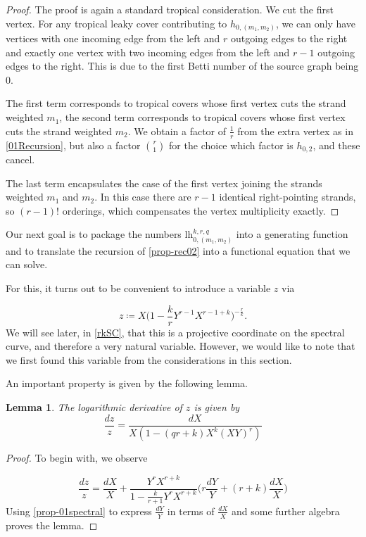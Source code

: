 \documentclass[10pt,a4paper,oneside,no-math,reqno]{amsart}%
\theoremstyle{plain}
\newtheorem{lemma}[theorem]{Lemma}
\theoremstyle{definition}
\theoremstyle{remark}
\numberwithin{equation}{section}
\newcommand{\1}{\mathds{1}}
\newcommand{\<}{\langle}
\renewcommand{\>}{\rangle}
\newcommand{\lh}{\mathord{\mathrm{l\!h}}}
\begin{document}
\begin{proof}
  The proof is again a standard tropical consideration. We cut the first vertex. For any tropical leaky cover contributing to $h_{0,(m_1,m_2)}$, we can only have vertices with one incoming edge from the left and $r$ outgoing edges to the right and exactly one vertex with two incoming edges from the left and $r-1$ outgoing edges to the right. This is due to the first Betti number of the source graph being $0$.\par
  The first term corresponds to tropical covers whose first vertex cuts the strand weighted $m_1$, the second term corresponds to tropical covers whose first vertex cuts the strand weighted $m_2$. We obtain a factor of $\frac{1}{r}$ from the extra vertex as in \cref{01Recursion}, but also a factor $ \binom{r}{1}$ for the choice which factor is $ h_{0,2}$, and these cancel.\par
  The last term encapsulates the case of the first vertex joining the strands weighted $m_1$ and $m_2$. In this case there are $r-1$ identical right-pointing strands, so $ (r-1)!$ orderings, which compensates the vertex multiplicity exactly.
\end{proof}

Our next goal is to package the numbers $\lh_{0,(m_1,m_2)}^{k,r,q}$ into a generating function and to translate the recursion of \cref{prop-rec02} into a functional equation that we can solve.

For this, it turns out to be convenient to introduce a variable $z$ via

\begin{equation}
	z \coloneq X \big( 1 - \frac{k}{r} Y^{r-1} X^{r-1+k} \big)^{-\frac{r}{k}} .
\end{equation}
We will see later, in \cref{rkSC}, that this is a projective coordinate on the spectral curve, and therefore a very natural variable. However, we would like to note that we first found this variable from the considerations in this section.


An important property is given by the following lemma.

\begin{lemma}\label{LogDerz}
	The logarithmic derivative of $z$ is given by
	\begin{equation}
		\frac{dz}{z} = \frac{dX}{X(1- (qr+k) X^k (XY)^{r})}
	\end{equation}
\end{lemma}	

\begin{proof}
To begin with, we observe

\begin{equation}
    \frac{dz}{z}=\frac{dX}{X} + \frac{ Y^{r} X^{r+k}}{ 1 - \frac{k}{r+1} Y^{r} X^{r+k}} \Big( r \frac{dY}{Y} + (r+k) \frac{dX}{X} \Big)
\end{equation}
    Using \cref{prop-01spectral} to express $\frac{dY}{Y}$ in terms of $\frac{dX}{X}$ and some further algebra proves the lemma.
\end{proof}
\end{document}
